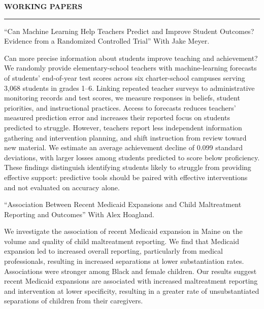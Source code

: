 \documentclass[11pt]{article}
\newenvironment{rSection}[1]{
  \vspace{1.5em}
  \noindent\textbf{\MakeUppercase{#1}}
  \vspace{0.2em}\hrule\vspace{0.5em}
}{}
\renewenvironment{quote}{%
  \list{}{\rightmargin=0pt \leftmargin=1.5em}%
  \item\relax
}
{\endlist}
\begin{document}
\begin{rSection}{Working Papers}
    ``Can Machine Learning Help Teachers Predict and Improve Student Outcomes? Evidence from a Randomized Controlled Trial'' With Jake Meyer.
    \begin{quote}
        \small{Can more precise information about students improve teaching and achievement? We randomly provide elementary-school teachers with machine-learning forecasts of students' end-of-year test scores across six charter-school campuses serving 3,068 students in grades 1--6. Linking repeated teacher surveys to administrative monitoring records and test scores, we measure responses in beliefs, student priorities, and instructional practices. Access to forecasts reduces teachers' measured prediction error and increases their reported focus on students predicted to struggle. However, teachers report less independent information gathering and intervention planning, and shift instruction from review toward new material. We estimate an average achievement decline of 0.099 standard deviations, with larger losses among students predicted to score below proficiency. These findings distinguish identifying students likely to struggle from providing effective support: predictive tools should be paired with effective interventions and not evaluated on accuracy alone.}
    \end{quote}
    
    ``Association Between Recent Medicaid Expansions and Child Maltreatment Reporting and Outcomes'' With Alex Hoagland.
    \begin{quote}
        \small{We investigate the association of recent Medicaid expansion in Maine on the volume and quality of child maltreatment reporting. We find that Medicaid expansion led to increased overall reporting, particularly from medical professionals, resulting in increased separations at lower substantiation rates. Associations were stronger among Black and female children. Our results suggest recent Medicaid expansions are associated with increased maltreatment reporting and intervention at lower specificity, resulting in a greater rate of unsubstantiated separations of children from their caregivers.}
    \end{quote}


\end{rSection}
\end{document}
